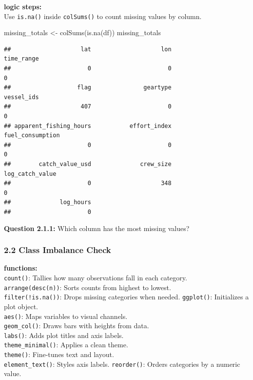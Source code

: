 \documentclass[
]{article}
\newenvironment{Shaded}{\begin{snugshade}}{\end{snugshade}}
\newcommand{\FunctionTok}[1]{\textcolor[rgb]{0.00,0.00,0.00}{#1}}
\newcommand{\NormalTok}[1]{#1}
\newcommand{\OtherTok}[1]{\textcolor[rgb]{0.56,0.35,0.01}{#1}}
\begin{document}
\textbf{logic steps:}\\
Use \texttt{is.na()} inside \texttt{colSums()} to count missing values
by column.

\begin{Shaded}
\begin{Highlighting}[]
\NormalTok{missing\_totals }\OtherTok{\textless{}{-}} \FunctionTok{colSums}\NormalTok{(}\FunctionTok{is.na}\NormalTok{(df))}
\NormalTok{missing\_totals}
\end{Highlighting}
\end{Shaded}

\begin{verbatim}
##                    lat                    lon             time_range 
##                      0                      0                      0 
##                   flag               geartype             vessel_ids 
##                    407                      0                      0 
## apparent_fishing_hours           effort_index       fuel_consumption 
##                      0                      0                      0 
##        catch_value_usd              crew_size        log_catch_value 
##                      0                    348                      0 
##              log_hours 
##                      0
\end{verbatim}

\textbf{Question 2.1.1:} Which column has the most missing values?

\hypertarget{class-imbalance-check}{%
\subsubsection{2.2 Class Imbalance Check}\label{class-imbalance-check}}

\textbf{functions:}\\
\texttt{count()}: Tallies how many observations fall in each category.\\
\texttt{arrange(desc(n))}: Sorts counts from highest to lowest.\\
\texttt{filter(!is.na())}: Drops missing categories when needed.
\texttt{ggplot()}: Initializes a plot object.\\
\texttt{aes()}: Maps variables to visual channels.\\
\texttt{geom\_col()}: Draws bars with heights from data.\\
\texttt{labs()}: Adds plot titles and axis labels.\\
\texttt{theme\_minimal()}: Applies a clean theme.\\
\texttt{theme()}: Fine-tunes text and layout.\\
\texttt{element\_text()}: Styles axis labels. \texttt{reorder()}: Orders
categories by a numeric value.
\end{document}
